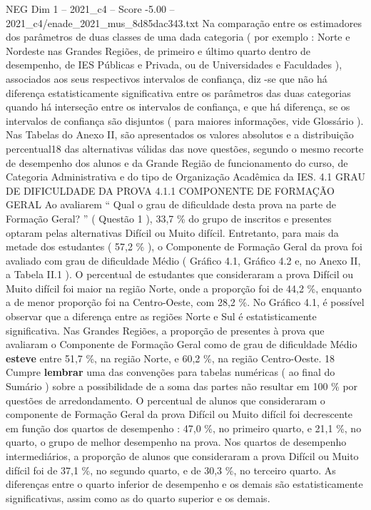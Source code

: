 \begin{textsample}{NEG Dim 1 – 2021\_c4 – Score -5.00 – 2021\_c4/enade\_2021\_mus\_8d85dac343.txt}
Na comparação entre os estimadores dos parâmetros de duas classes de uma dada categoria ( por exemplo : Norte e Nordeste nas Grandes Regiões, de primeiro e último quarto dentro de desempenho, de IES Públicas e Privada, ou de Universidades e Faculdades ), associados aos seus respectivos intervalos de confiança, diz -se que não há diferença estatisticamente significativa entre os parâmetros das duas categorias quando há interseção entre os intervalos de confiança, e que há diferença, se os intervalos de confiança são disjuntos ( para maiores informações, vide Glossário ).
Nas Tabelas do Anexo II, são apresentados os valores absolutos e a distribuição percentual18 das alternativas válidas das nove questões, segundo o mesmo recorte de desempenho dos alunos e da Grande Região de funcionamento do curso, de Categoria Administrativa e do tipo de Organização Acadêmica da IES. 4.1 GRAU DE DIFICULDADE DA PROVA 4.1.1 COMPONENTE DE FORMAÇÃO GERAL Ao avaliarem “ Qual o grau de dificuldade desta prova na parte de Formação Geral? ” ( Questão 1 ), 33,7 \% do grupo de inscritos e presentes optaram pelas alternativas Difícil ou Muito difícil.
Entretanto, para mais da metade dos estudantes ( 57,2 \% ), o Componente de Formação Geral da prova foi avaliado com grau de dificuldade Médio ( Gráfico 4.1, Gráfico 4.2 e, no Anexo II, a Tabela II.1 ).
O percentual de estudantes que consideraram a prova Difícil ou Muito difícil foi maior na região Norte, onde a proporção foi de 44,2 \%, enquanto a de menor proporção foi na Centro-Oeste, com 28,2 \%.
No Gráfico 4.1, é possível observar que a diferença entre as regiões Norte e Sul é estatisticamente significativa.
Nas Grandes Regiões, a proporção de presentes à prova que avaliaram o Componente de Formação Geral como de grau de dificuldade Médio \textbf{esteve} entre 51,7 \%, na região Norte, e 60,2 \%, na região Centro-Oeste. 18 Cumpre \textbf{lembrar} uma das convenções para tabelas numéricas ( ao final do Sumário ) sobre a possibilidade de a soma das partes não resultar em 100 \% por questões de arredondamento.
O percentual de alunos que consideraram o componente de Formação Geral da prova Difícil ou Muito difícil foi decrescente em função dos quartos de desempenho : 47,0 \%, no primeiro quarto, e 21,1 \%, no quarto, o grupo de melhor desempenho na prova.
Nos quartos de desempenho intermediários, a proporção de alunos que consideraram a prova Difícil ou Muito difícil foi de 37,1 \%, no segundo quarto, e de 30,3 \%, no terceiro quarto.
As diferenças entre o quarto inferior de desempenho e os demais são estatisticamente significativas, assim como as do quarto superior e os demais.

\end{textsample}

